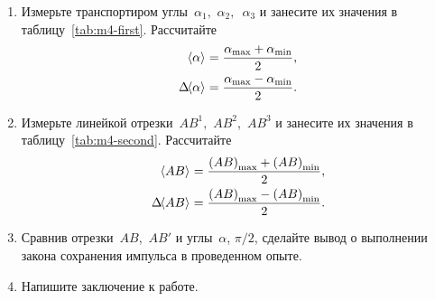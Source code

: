 \documentclass[a4paper, 12pt]{extarticle}
\begin{document}
\begin{enumerate}
      \item Измерьте транспортиром углы~$\alpha_1,$ $\alpha_2,$~$\alpha_3$ и занесите их значения в таблицу~\ref{tab:m4-first}.
           Рассчитайте
           \begin{align}
           \label{eq:m4-value-alpha}
           \hspace{-3pt}\left<\alpha\right>\hspace{-3pt}\ &= \frac{\alpha_{\max} + \alpha_{\min}}{2}, \\
           \label{eq:m4-value-dalpha}
           \Delta\hspace{-3pt}\left<\alpha\right>\hspace{-3pt}\ &= \frac{\alpha_{\max} - \alpha_{\min}}{2}.
           \end{align}

      \item Измерьте линейкой отрезки~$AB^1,$ $AB^2$,~$AB^3$ и занесите их значения в таблицу~\ref{tab:m4-second}.
           Рассчитайте
          \begin{align}
          \label{eq:m4-value-AB}
          \hspace{-3pt}\left<AB\right>\hspace{-3pt}\ &= \frac{\left(AB\right)_{\max} + \left(AB\right)_{\min}}{2}, \\
          \label{eq:m4-value-deltaAB}
          \Delta \hspace{-3pt}\left<AB\right>\hspace{-3pt}\ &= \frac{\left(AB\right)_{\max} - \left(AB\right)_{\min}}{2}.
          \end{align}
          \item %
           Сравнив отрезки~$AB$,~$AB'$ и углы~$\alpha$, $\pi/2$, сделайте вывод о выполнении закона сохранения импульса в проведенном опыте. %
      \item Напишите заключение к работе.
\end{enumerate}
\end{document}
